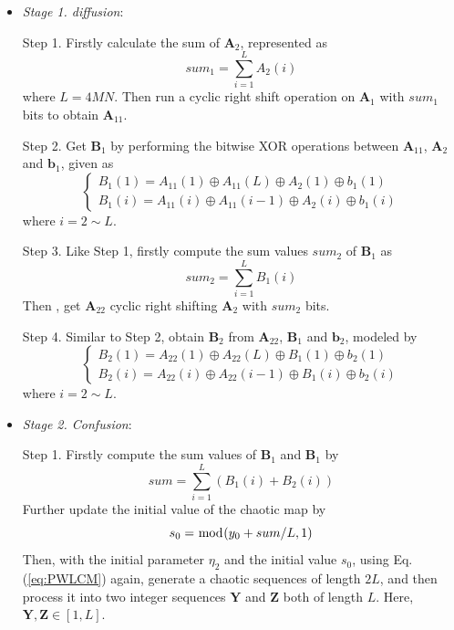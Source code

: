\documentclass[final,3p,times]{elsarticle}
\begin{document}
\begin{itemize}
	
	\item \emph{Stage 1. diffusion}:
	
	Step 1. Firstly calculate the sum of $\bm{A}_2$, represented as
	\begin{equation}
	sum_1 = \sum\limits_{i= 1}^{L} A_2(i)
	\label{eq:sum1}
	\end{equation}
	where $L=4MN$. Then run a cyclic right shift operation on $\bm{A}_1$ with $sum_1$ bits to obtain $\bm{A}_{11}$.
	
	Step 2. Get $\bm{B}_{1}$ by performing the bitwise XOR operations between $\bm{A}_{11}$, $\bm{A}_{2}$ and $\bm{b}_{1}$, given as
	\begin{equation}
	\left\{ \begin{array}{l}
	B_1(1) = A_{11}(1) \oplus A_{11}(L) \oplus A_{2}(1) \oplus b_{1}(1)\\
	B_1(i) = A_{11}(i) \oplus A_{11}(i-1) \oplus A_{2}(i) \oplus b_{1}(i)
	\end{array} \right.
	\label{eq:B1_diffusion}
	\end{equation}
	where $i=2 \sim L$.
	
	Step 3. Like Step 1, firstly compute the sum values $sum_2$ of $\bm{B}_1$ as
	\begin{equation}
	sum_2 = \sum\limits_{i= 1}^{L} B_1(i)
	\label{eq:sum2}
	\end{equation}
	Then , get $\bm{A}_{22}$ cyclic right shifting $\bm{A}_2$ with $sum_2$ bits.
	
	Step 4. Similar to Step 2, obtain $\bm{B}_{2}$ from $\bm{A}_{22}$, $\bm{B}_{1}$ and $\bm{b}_{2}$, modeled by
	\begin{equation}
	\left\{ \begin{array}{l}
	B_2(1) = A_{22}(1) \oplus A_{22}(L) \oplus B_{1}(1) \oplus b_{2}(1)\\
	B_2(i) = A_{22}(i) \oplus A_{22}(i-1) \oplus B_{1}(i) \oplus b_{2}(i)
	\end{array} \right.
	\label{eq:B2_diffusion}
	\end{equation}
	where $i=2 \sim L$.
	
	\item \emph{Stage 2. Confusion}:
	
	Step 1. Firstly compute the sum values of $\bm{B}_1$ and $\bm{B}_1$ by
	\begin{equation}
	sum = \sum\limits_{i= 1}^{L} (B_1(i)+B_2(i))
	\label{eq:sum3}
	\end{equation}
	Further update the initial value of the chaotic map by
	\begin{equation}
	s_0 = \bmod(y_0+sum/L,1)\\
	\label{eq:update_y0}
	\end{equation}
	Then, with the initial parameter $\eta_2$ and the initial value $s_0$,  using Eq. (\ref{eq:PWLCM}) again, generate a chaotic sequences of length $2L$, and then process it into two integer sequences $\bm{Y}$ and $\bm{Z}$ both of length $L$. Here, $\bm{Y},\bm{Z} \in [1,L]$.
	

\end{itemize}
\end{document}
